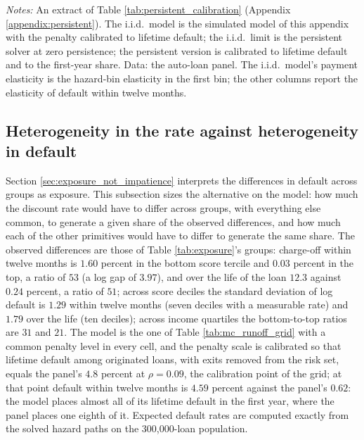 \documentclass[12pt,english]{article}
\begin{document}
\begin{table}[H]
\centering
\caption{The two calibrations of the stopping model beside the data: what each reproduces}
\label{tab:persistent_extract}
\small

\vspace{0.5em}
\begin{minipage}{0.92\textwidth}
\noindent \small \textit{Notes:} An extract of Table \ref{tab:persistent_calibration} (Appendix \ref{appendix:persistent}). The i.i.d.\ model is the simulated model of this appendix with the penalty calibrated to lifetime default; the i.i.d.\ limit is the persistent solver at zero persistence; the persistent version is calibrated to lifetime default and to the first-year share. Data: the auto-loan panel. The i.i.d.\ model's payment elasticity is the hazard-bin elasticity in the first bin; the other columns report the elasticity of default within twelve months.
\end{minipage}
\end{table}




\subsection{Heterogeneity in the rate against heterogeneity in default}\label{appendix:rhovariance}

Section \ref{sec:exposure_not_impatience} interprets the differences in default across groups as exposure. This subsection sizes the alternative on the model: how much the discount rate would have to differ across groups, with everything else common, to generate a given share of the observed differences, and how much each of the other primitives would have to differ to generate the same share. The observed differences are those of Table \ref{tab:exposure}'s groups: charge-off within twelve months is $1.60$ percent in the bottom score tercile and $0.03$ percent in the top, a ratio of $53$ (a log gap of $3.97$), and over the life of the loan $12.3$ against $0.24$ percent, a ratio of $51$; across score deciles the standard deviation of log default is $1.29$ within twelve months (seven deciles with a measurable rate) and $1.79$ over the life (ten deciles); across income quartiles the bottom-to-top ratios are $31$ and $21$. The model is the one of Table \ref{tab:mc_runoff_grid} with a common penalty level in every cell, and the penalty scale is calibrated so that lifetime default among originated loans, with exits removed from the risk set, equals the panel's $4.8$ percent at $\rho = 0.09$, the calibration point of the grid; at that point default within twelve months is $4.59$ percent against the panel's $0.62$: the model places almost all of its lifetime default in the first year, where the panel places one eighth of it. Expected default rates are computed exactly from the solved hazard paths on the 300,000-loan population.
\end{document}
